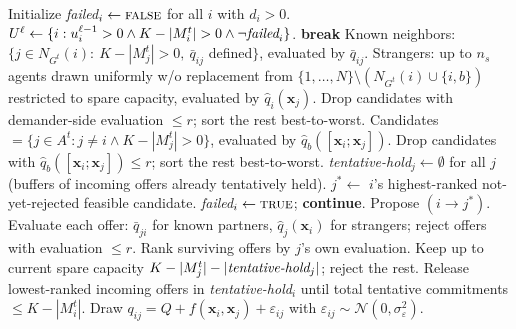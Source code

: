 \documentclass[11pt]{article}
\newcommand{\x}{\mathbf{x}}
\newcommand{\qhat}{\hat{q}}
\newcommand{\self}{\mathrm{self}}
\newcommand{\brk}{\mathrm{broker}}
\newcommand{\Ntot}{N}
\begin{document}
\begin{algorithm}[H]
\caption{\textsc{WithinPeriodRounds}$(t,\{d_i\},\{\text{decision}_i\},A^t)$. Runs at most $R_{\max}\le K$ rounds.}\label{alg:round}
\begin{algorithmic}[1]
\STATE Initialize \emph{failed}$_i\gets\textsc{false}$ for all $i$ with $d_i>0$.
\LOOP
  \STATE $U^\ell\gets\{i : u_i^{\ell-1}>0 \wedge K-|M_i^t|>0 \wedge\neg\emph{failed}_i\}$.
    \STATE \textbf{break}
  \ENDIF
  \STATE {}
    \IF{$\text{decision}_i=\self$}
      \STATE Known neighbors: $\{j\in N_{G^t}(i):\ K-|M_j^t|>0,\ \bar q_{ij}$ defined$\}$, evaluated by $\bar q_{ij}$.
      \STATE Strangers: up to $n_s$ agents drawn uniformly w/o replacement from $\{1,\ldots,\Ntot\}\setminus(N_{G^t}(i)\cup\{i,b\})$ restricted to spare capacity, evaluated by $\qhat_i(\x_j)$.
      \STATE Drop candidates with demander-side evaluation $\le r$; sort the rest best-to-worst.
    \ELSIF{$\text{decision}_i=\brk$}
      \STATE Candidates $=\{j\in A^t:j\neq i \wedge K-|M_j^t|>0\}$, evaluated by $\qhat_b([\x_i;\x_j])$.
      \STATE Drop candidates with $\qhat_b([\x_i;\x_j])\le r$; sort the rest best-to-worst.
    \ENDIF
  \ENDFOR
  \STATE {}
  \STATE \emph{tentative-hold}$_j\gets\emptyset$ for all $j$ (buffers of incoming offers already tentatively held).
  \REPEAT
      \STATE $j^*\gets$ $i$'s highest-ranked not-yet-rejected feasible candidate.
        \STATE \emph{failed}$_i\gets\textsc{true}$; \textbf{continue}.
      \ENDIF
      \STATE Propose $(i\to j^*)$.
    \ENDFOR
      \STATE Evaluate each offer: $\bar q_{ji}$ for known partners, $\qhat_j(\x_i)$ for strangers; reject offers with evaluation $\le r$.
      \STATE Rank surviving offers by $j$'s own evaluation. Keep up to current spare capacity $K-|M_j^t|-|\emph{tentative-hold}_j|$; reject the rest.
    \ENDFOR
      \STATE Release lowest-ranked incoming offers in \emph{tentative-hold}$_i$ until total tentative commitments $\le K-|M_i^t|$.
    \ENDFOR
  \STATE {}
    \STATE Draw $q_{ij}=Q+f(\x_i,\x_j)+\varepsilon_{ij}$ with $\varepsilon_{ij}\sim\mathcal{N}(0,\sigma_\varepsilon^2)$.

\end{algorithmic}
\end{algorithm}
\end{document}

